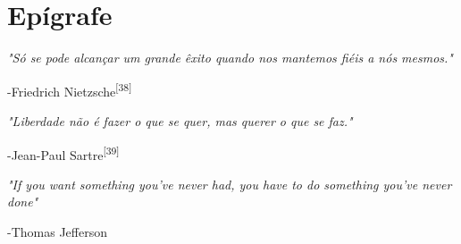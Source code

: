 \chapter*{Epígrafe}

\emph{"Só se pode alcançar um grande êxito quando nos mantemos fiéis a nós mesmos."}
	\begin{flushright}
		-Friedrich Nietzsche\textsuperscript{[38]}
	\end{flushright}

\emph{"Liberdade não é fazer o que se quer, mas querer o que se faz."}
	\begin{flushright}
		-Jean-Paul Sartre\textsuperscript{[39]}
	\end{flushright}


\emph{"If you want something you've never had, you have to do something you've never done"}
	\begin{flushright}
		-Thomas Jefferson
	\end{flushright}
